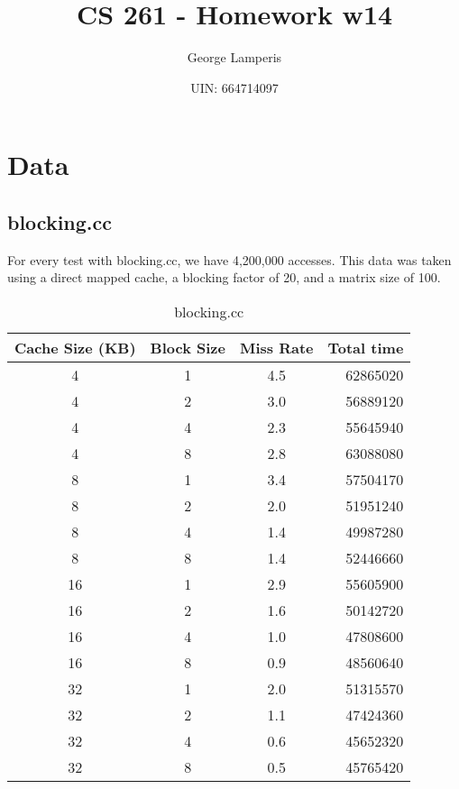 \documentclass[letterpaper, 12pt, oneside]{memoir}
\title{CS 261 - Homework w14}
\author{George Lamperis}
\date{UIN: 664714097}
\begin{document}
\maketitle

\section{Data}

\subsection{blocking.cc}
For every test with blocking.cc, we have 4,200,000 accesses. This data 
was taken using a direct mapped cache, a blocking factor of 20, and a matrix
size of 100.

\begin{table}[H]
\centering
\begin{tabular}{c|c|c|r}
    Cache Size (KB)  & Block Size & Miss Rate & Total time \\ \hline 
    4  & 1 & 4.5    & 62865020 \\
    4  & 2 & 3.0    & 56889120 \\
    4  & 4 & 2.3    & 55645940 \\
    4  & 8 & 2.8    & 63088080 \\ \hline
    8  & 1 & 3.4    & 57504170 \\
    8  & 2 & 2.0    & 51951240 \\
    8  & 4 & 1.4    & 49987280 \\
    8  & 8 & 1.4    & 52446660 \\ \hline
    16 & 1 & 2.9    & 55605900 \\
    16 & 2 & 1.6    & 50142720 \\
    16 & 4 & 1.0    & 47808600 \\
    16 & 8 & 0.9    & 48560640 \\ \hline
    32 & 1 & 2.0    & 51315570 \\
    32 & 2 & 1.1    & 47424360 \\
    32 & 4 & 0.6    & 45652320 \\
    32 & 8 & 0.5    & 45765420 \\
\end{tabular}
\caption{blocking.cc}
\end{table}
\end{document}
